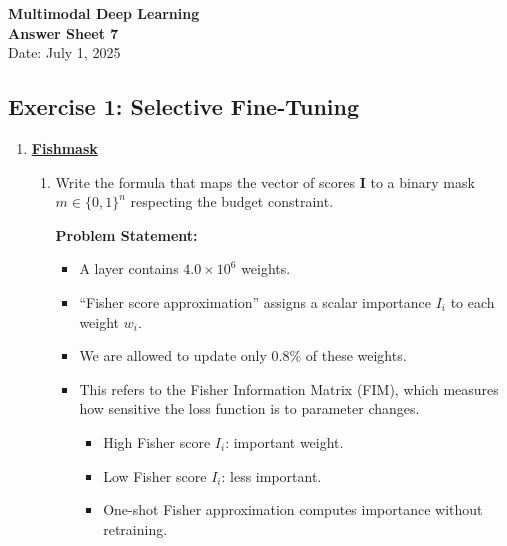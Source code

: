 \documentclass[11pt]{article}
\begin{document}
\begin{center}
    {\Large \textbf{Multimodal Deep Learning}} \\ [0.3em]
    {\large \textbf{Answer Sheet 7}} \\ [0.3em]
    \large Date: July 1, 2025 \\
\end{center}

\vspace{1cm}

\subsection*{Exercise 1: Selective Fine-Tuning}

\begin{enumerate}[label=(\alph*)]
    \item \href{https://arxiv.org/abs/2411.05752}{\textbf{Fishmask}} 

    \begin{enumerate}[label=(\roman*)]
        \item Write the formula that maps the vector of scores \(\mathbf{I}\) to a binary mask \(m \in \{0, 1\}^n\) respecting the budget constraint.

        \textbf{Problem Statement:} 
        \begin{itemize}
            \item A layer contains \(4.0 \times 10^6\) weights.
            \item ``Fisher score approximation'' assigns a scalar importance \(I_i\) to each weight \(w_i\).
            \item We are allowed to update only 0.8\% of these weights.
            \item This refers to the Fisher Information Matrix (FIM), which measures how sensitive the loss function is to parameter changes.
            \begin{itemize}
                \item High Fisher score \(I_i\): important weight.
                \item Low Fisher score \(I_i\): less important.
                \item One-shot Fisher approximation computes importance without retraining.
            \end{itemize}
        \end{itemize}
        

\end{enumerate}
\end{enumerate}
\end{document}
